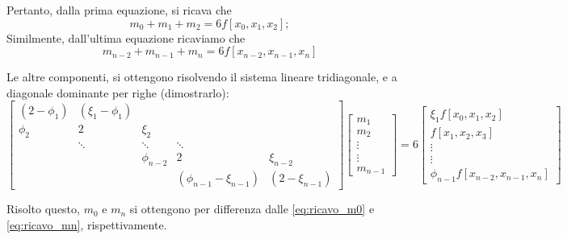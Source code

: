 Pertanto, dalla prima equazione, si ricava che
\begin{equation} \label{eq:ricavo_m0}
m_0 + m_1 + m_2 = 6f[x_0, x_1, x_2] ;
\end{equation}
Similmente, dall'ultima equazione ricaviamo che
\begin{equation} \label{eq:ricavo_mn}
m_{n-2} + m_{n-1} + m_n = 6f[x_{n-2}, x_{n-1}, x_n]
\end{equation}

Le altre componenti, si ottengono risolvendo il sistema lineare tridiagonale, e a diagonale dominante per righe (dimostrarlo):
\begin{equation*}
\begin{bmatrix}
(2-\phi_1) & (\xi_1-\phi_1) & & & \\
\phi_2 & 2 & \xi_2 & & \\
& \ddots & \ddots & \ddots & \\
& & \phi_{n-2} & 2 & \xi_{n-2} \\
& & & (\phi_{n-1}-\xi_{n-1}) & (2-\xi_{n-1})
\end{bmatrix}
\begin{bmatrix}
m_1 \\ m_2 \\ \vdots \\ \vdots \\ m_{n-1}
\end{bmatrix}
= 6
\begin{bmatrix}
\xi_1 f[x_0, x_1, x_2] \\
f[x_1, x_2, x_3] \\
\vdots \\
\vdots \\
\phi_{n-1} f[x_{n-2}, x_{n-1}, x_n]
\end{bmatrix}
\end{equation*}

Risolto questo, $m_0$ e $m_n$ si ottengono per differenza dalle \eqref{eq:ricavo_m0} e \eqref{eq:ricavo_mn}, rispettivamente.


\newpage %

